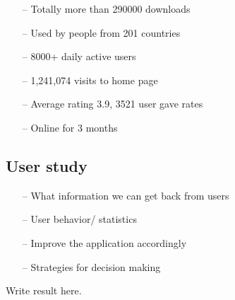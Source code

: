 
\begin{itemize}
\item[--]Totally more than 290000 downloads
\item[--]Used by people from 201 countries
\item[--]8000+ daily active users
\item[--]1,241,074 visits to home page
\item[--]Average rating 3.9, 3521 user gave rates
\item[--]Online for 3 months
\end{itemize}
\subsection*{User study}
\begin{itemize}
\item[--]What information we can get back from users
\item[--]User behavior/ statistics
\item[--]Improve the application accordingly
\item[--]Strategies for decision making
\end{itemize}
Write result here.